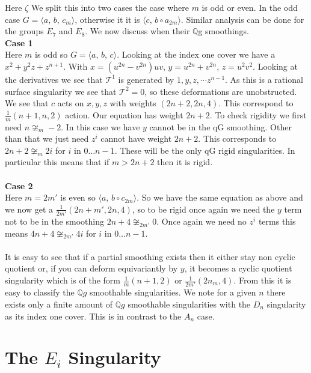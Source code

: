 \documentclass[11pt]{amsart}
\theoremstyle{definition}
\theoremstyle{definition}
\theoremstyle{definition}
\theoremstyle{definition}
\theoremstyle{definition}
\theoremstyle{definition}
\theoremstyle{definition}
\theoremstyle{definition}
\begin{document}
Here $\zeta$ We split this into two cases the case where $m$ is odd or even. In the odd case $G = \langle a, \, b, \, c_m \rangle$, otherwise it it is $\langle c, \, b \circ a_{2m} \rangle$.
Similar analysis can be done for the groups $E_7$ and $E_8$. We now discuss when their $\mathbb{Q}$g smoothings.
\\
\textbf{Case 1}
\\
Here $m$ is odd so  $G = \langle a, \, b , \, c \rangle$.  Looking at the index one cover we have a $x^2 + y^2z + z^{n+1}$. With $x = (u^{2n} - v^{2n})uv$, $y = u^{2n} + v^{2n}$, $z = u^2v^2$. Looking at the derivatives we see that $\mathcal{T}^1$ is generated by $1,y, z, \cdots z^{n-1}$. As this is a rational surface singularity we see that $\mathcal{T}^2 = 0$, so these deformations are unobstructed. We see that $c$ acts on $x,y,z$ with weights $(2n+2, 2n, 4)$. This correspond to $\frac{1}{m}(n+1, n, 2)$ action. Our equation has weight $2n+2$. To check rigidity we first need $n \not\cong_m -2$. In this case we have $y$ cannot be in the qG smoothing. Other than that we just need $z^i$ cannot have weight $2n+2$. This corresponds to $2n+2 \not\cong_m 2i$ for $i$ in $0 \dots n-1$. These will be the only qG rigid singularities. In particular this means that if $m > 2n+2$ then it is rigid.
\\
\\
\textbf{Case 2}
\\
Here $m = 2m'$ is even so $\langle a, \, b \circ c_{2m} \rangle$. So we have the same equation as above and we now get a 
$\frac{1}{2m'}(2n+m', 2n, 4)$, so to be rigid once again we need the $y$ term not to be in the smoothing $2n+4
 \not\cong_{2m'} 0$. Once again we need no $z^i$ terms this means  $4n+4 \not\cong_{2m'} 4i$  for $i$ in $0 \dots n-1$. 
 \\
 \\
 It is easy to see that if a partial smoothing exists then it either stay non cyclic quotient or, if you can deform equivariantly by $y$, it becomes a cyclic quotient singularity which is of the form $\frac{1}{m}(n+1, 2)$ or $\frac{1}{2m'}(2n_m, 4)$. From this it is easy to classify the $\mathbb{Q}g$ smoothable singularities. We note for a given $n$ there exists only a finite amount of $\mathbb{Q}g$ smoothable singularities with the $D_n$ singularity as its index one cover. This is in contrast to the $A_n$ case.
 
 \section{The $E_i$ Singularity}
 
\end{document}
